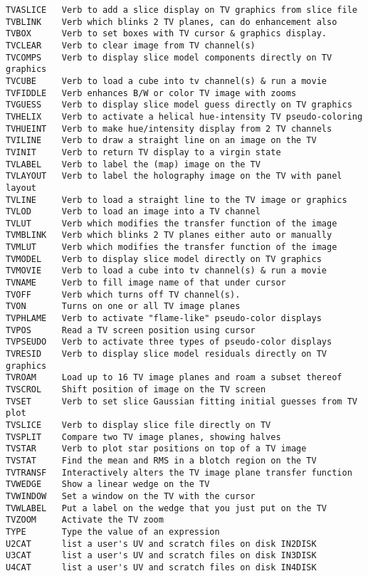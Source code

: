 \begin{verbatim}
TVASLICE   Verb to add a slice display on TV graphics from slice file
TVBLINK    Verb which blinks 2 TV planes, can do enhancement also
TVBOX      Verb to set boxes with TV cursor & graphics display.
TVCLEAR    Verb to clear image from TV channel(s)
TVCOMPS    Verb to display slice model components directly on TV graphics
TVCUBE     Verb to load a cube into tv channel(s) & run a movie
TVFIDDLE   Verb enhances B/W or color TV image with zooms
TVGUESS    Verb to display slice model guess directly on TV graphics
TVHELIX    Verb to activate a helical hue-intensity TV pseudo-coloring
TVHUEINT   Verb to make hue/intensity display from 2 TV channels
TVILINE    Verb to draw a straight line on an image on the TV
TVINIT     Verb to return TV display to a virgin state
TVLABEL    Verb to label the (map) image on the TV
TVLAYOUT   Verb to label the holography image on the TV with panel layout
TVLINE     Verb to load a straight line to the TV image or graphics
TVLOD      Verb to load an image into a TV channel
TVLUT      Verb which modifies the transfer function of the image
TVMBLINK   Verb which blinks 2 TV planes either auto or manually
TVMLUT     Verb which modifies the transfer function of the image
TVMODEL    Verb to display slice model directly on TV graphics
TVMOVIE    Verb to load a cube into tv channel(s) & run a movie
TVNAME     Verb to fill image name of that under cursor
TVOFF      Verb which turns off TV channel(s).
TVON       Turns on one or all TV image planes
TVPHLAME   Verb to activate "flame-like" pseudo-color displays
TVPOS      Read a TV screen position using cursor
TVPSEUDO   Verb to activate three types of pseudo-color displays
TVRESID    Verb to display slice model residuals directly on TV graphics
TVROAM     Load up to 16 TV image planes and roam a subset thereof
TVSCROL    Shift position of image on the TV screen
TVSET      Verb to set slice Gaussian fitting initial guesses from TV plot
TVSLICE    Verb to display slice file directly on TV
TVSPLIT    Compare two TV image planes, showing halves
TVSTAR     Verb to plot star positions on top of a TV image
TVSTAT     Find the mean and RMS in a blotch region on the TV
TVTRANSF   Interactively alters the TV image plane transfer function
TVWEDGE    Show a linear wedge on the TV
TVWINDOW   Set a window on the TV with the cursor
TVWLABEL   Put a label on the wedge that you just put on the TV
TVZOOM     Activate the TV zoom
TYPE       Type the value of an expression
U2CAT      list a user's UV and scratch files on disk IN2DISK
U3CAT      list a user's UV and scratch files on disk IN3DISK
U4CAT      list a user's UV and scratch files on disk IN4DISK

\end{verbatim}
